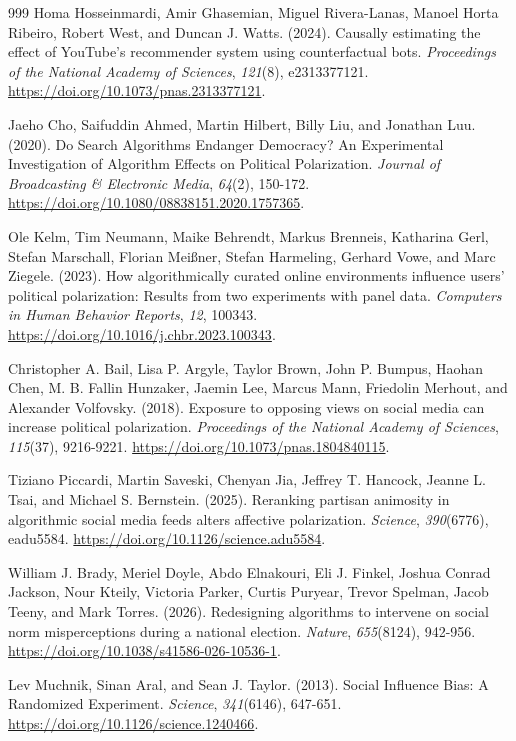 \documentclass[10pt,a4paper]{article}
\begin{document}
\begin{thebibliography}{999}
Homa Hosseinmardi, Amir Ghasemian, Miguel Rivera-Lanas, Manoel Horta Ribeiro, Robert West, and Duncan J. Watts. (2024). Causally estimating the effect of YouTube's recommender system using counterfactual bots. \textit{Proceedings of the National Academy of Sciences}, \textit{121}(8), e2313377121. \url{https://doi.org/10.1073/pnas.2313377121}.

Jaeho Cho, Saifuddin Ahmed, Martin Hilbert, Billy Liu, and Jonathan Luu. (2020). Do Search Algorithms Endanger Democracy? An Experimental Investigation of Algorithm Effects on Political Polarization. \textit{Journal of Broadcasting \& Electronic Media}, \textit{64}(2), 150-172. \url{https://doi.org/10.1080/08838151.2020.1757365}.

Ole Kelm, Tim Neumann, Maike Behrendt, Markus Brenneis, Katharina Gerl, Stefan Marschall, Florian Mei{\ss}ner, Stefan Harmeling, Gerhard Vowe, and Marc Ziegele. (2023). How algorithmically curated online environments influence users' political polarization: Results from two experiments with panel data. \textit{Computers in Human Behavior Reports}, \textit{12}, 100343. \url{https://doi.org/10.1016/j.chbr.2023.100343}.

Christopher A. Bail, Lisa P. Argyle, Taylor Brown, John P. Bumpus, Haohan Chen, M. B. Fallin Hunzaker, Jaemin Lee, Marcus Mann, Friedolin Merhout, and Alexander Volfovsky. (2018). Exposure to opposing views on social media can increase political polarization. \textit{Proceedings of the National Academy of Sciences}, \textit{115}(37), 9216-9221. \url{https://doi.org/10.1073/pnas.1804840115}.

Tiziano Piccardi, Martin Saveski, Chenyan Jia, Jeffrey T. Hancock, Jeanne L. Tsai, and Michael S. Bernstein. (2025). Reranking partisan animosity in algorithmic social media feeds alters affective polarization. \textit{Science}, \textit{390}(6776), eadu5584. \url{https://doi.org/10.1126/science.adu5584}.

William J. Brady, Meriel Doyle, Abdo Elnakouri, Eli J. Finkel, Joshua Conrad Jackson, Nour Kteily, Victoria Parker, Curtis Puryear, Trevor Spelman, Jacob Teeny, and Mark Torres. (2026). Redesigning algorithms to intervene on social norm misperceptions during a national election. \textit{Nature}, \textit{655}(8124), 942-956. \url{https://doi.org/10.1038/s41586-026-10536-1}.

Lev Muchnik, Sinan Aral, and Sean J. Taylor. (2013). Social Influence Bias: A Randomized Experiment. \textit{Science}, \textit{341}(6146), 647-651. \url{https://doi.org/10.1126/science.1240466}.


\end{thebibliography}
\end{document}
